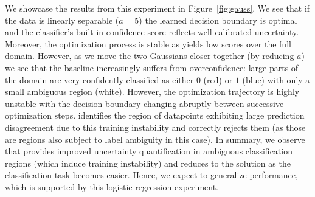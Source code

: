 We showcase the results from this experiment in Figure~\ref{fig:gauss}. We  see that if the data is linearly separable ($a=5$) the learned decision boundary is optimal and the classifier's built-in confidence score \sr reflects well-calibrated uncertainty. Moreover, the optimization process is stable as \sptd yields low scores over the full domain. However, as we move the two Gaussians closer together (\ie by reducing $a$) we see that the \sr baseline increasingly suffers from overconfidence: large parts of the domain are very confidently classified as either $0$ (red) or $1$ (blue) with only a small ambiguous region (white). However, the optimization trajectory is highly unstable with the decision boundary changing abruptly between successive optimization steps. \sptd identifies the region of datapoints exhibiting large prediction disagreement due to this training instability and correctly rejects them (as those are regions also subject to label ambiguity in this case). In summary, we observe that \sptd provides improved uncertainty quantification in ambiguous classification regions (which induce training instability) and reduces to the \sr solution as the classification task becomes easier. Hence, we expect \sptd to generalize \sr performance, which is supported by this logistic regression experiment. %

